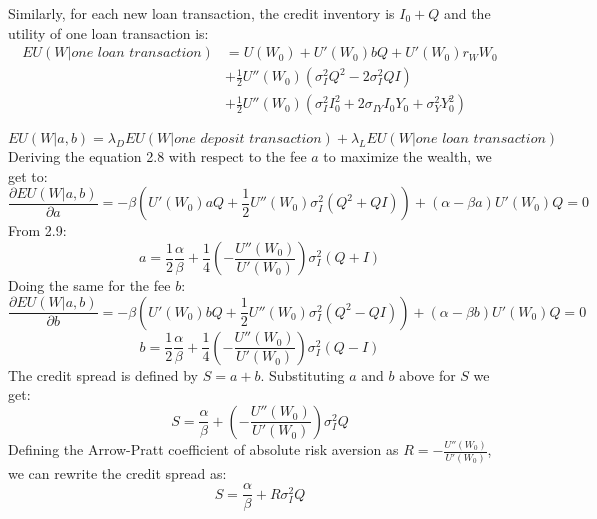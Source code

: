 Similarly, for each new loan transaction, the credit inventory is $I_0 + Q$ and the utility of one loan transaction is:
\begin{equation}
  \begin{aligned}
    EU(W|\textit{one loan transaction}) &= U(W_0) + U'(W_0)bQ +  U'(W_0)r_W W_0 \\ &+ \frac{1}{2}U''(W_0)(\sigma_I^2 Q^2 - 2\sigma_I^2 QI) \\ &+\frac{1}{2}U''(W_0)(\sigma_I^2 I_0^2 + 2\sigma_{IY} I_0 Y_0 + \sigma_Y^2 Y_0^2)
  \end{aligned}
\end{equation}

\begin{equation}
  EU(W|a,b) = \lambda_D EU(W|\textit{one deposit transaction}) + \lambda_L EU(W|\textit{one loan transaction})
\end{equation}
Deriving the equation 2.8 with respect to the fee $a$ to maximize the wealth, we get to:
\begin{equation}
  \frac{\partial EU(W|a,b)}{\partial a} = -\beta \left( U'(W_0)aQ +\frac{1}{2} U''(W_0)\sigma_I^2 (Q^2 + QI) \right) + (\alpha - \beta a) U'(W_0)Q = 0
\end{equation}
From 2.9:
\begin{equation}
  a = \frac{1}{2} \frac{\alpha}{\beta} + \frac{1}{4} \left(-\frac{U''(W_0)}{U'(W_0)}\right) \sigma_I^2(Q + I)
\end{equation}
Doing the same for the fee $b$:
\begin{equation}
  \frac{\partial EU(W|a,b)}{\partial b} = -\beta \left( U'(W_0)bQ +\frac{1}{2} U''(W_0)\sigma_I^2 (Q^2 - QI) \right) + (\alpha - \beta b) U'(W_0)Q = 0
\end{equation}
\begin{equation}
  b = \frac{1}{2} \frac{\alpha}{\beta} + \frac{1}{4} \left(-\frac{U''(W_0)}{U'(W_0)}\right) \sigma_I^2(Q - I)
\end{equation}
The credit spread is defined by $S=a+b$. Substituting $a$ and $b$ above for $S$ we get:
\begin{equation}
  S = \frac{\alpha}{\beta} + \left(-\frac{U''(W_0)}{U'(W_0)}\right) \sigma_I^2Q
\end{equation}
Defining the Arrow-Pratt coefficient of absolute risk aversion as $R = -\frac{U''(W_0)}{U'(W_0)}$, we can rewrite the credit spread as:
\begin{equation}
  S = \frac{\alpha}{\beta} + R \sigma_I^2 Q
\end{equation}

